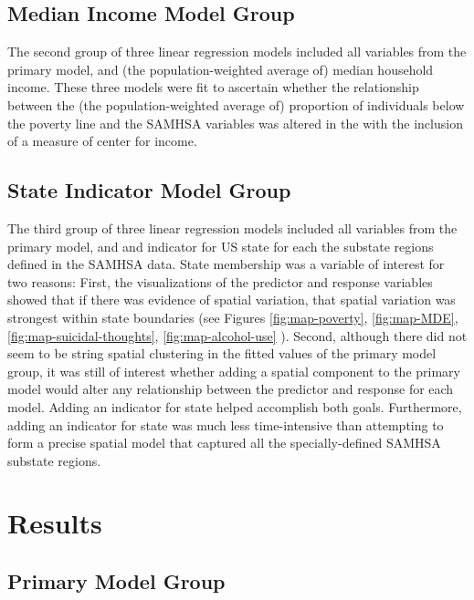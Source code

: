 \documentclass{article}
\begin{document}
\subsection{Median Income Model Group}

The second group of three linear regression models included all variables
from the primary model,
and
(the population-weighted average of)
median household income.
These three models were fit to ascertain whether
the relationship between the
(the population-weighted average of)
proportion of individuals below the poverty line
and the SAMHSA variables was altered in the
with the inclusion of a measure of center for income.

\subsection{State Indicator Model Group}

The third group of three linear regression models included all variables
from the primary model,
and and indicator for US state for each the
substate regions defined in the SAMHSA data.
State membership was a variable of interest for two
reasons:
First, the visualizations of the predictor and response variables
showed that if there was evidence of spatial variation,
that spatial variation was strongest within state boundaries
(see Figures
\ref{fig:map-poverty},
\ref{fig:map-MDE},
\ref{fig:map-suicidal-thoughts},
\ref{fig:map-alcohol-use}
).
Second, although there did not seem to be string spatial
clustering in the fitted values of the primary model group,
it was still of interest whether adding a spatial component to
the primary model would alter any relationship between
the predictor and response for each model.
Adding an indicator for state helped accomplish both goals.
Furthermore, adding an indicator for state was much less
time-intensive than attempting to form a precise spatial model
that captured all the specially-defined SAMHSA substate regions.


\section{Results}

\subsection{Primary Model Group}
\end{document}
